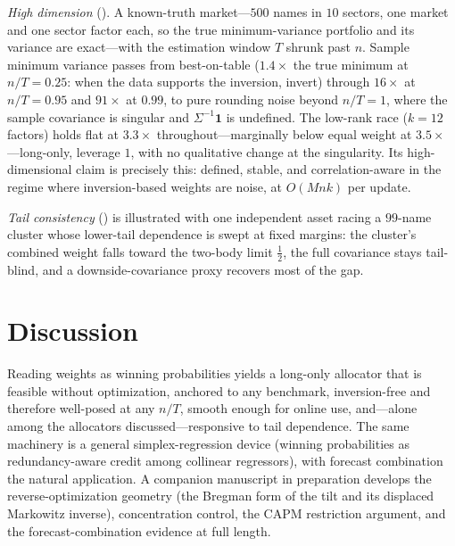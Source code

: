 \documentclass[11pt]{article}
\begin{document}
\emph{High dimension} (). A known-truth market---$500$ names
in $10$ sectors, one market and one sector factor each, so the true
minimum-variance portfolio and its variance are exact---with the estimation
window $T$ shrunk past $n$. Sample minimum variance passes from best-on-table
($1.4\times$ the true minimum at $n/T = 0.25$: when the data supports the
inversion, invert) through $16\times$ at $n/T = 0.95$ and $91\times$ at
$0.99$, to pure rounding noise beyond $n/T = 1$, where the sample covariance
is singular and $\Sigma^{-1}\mathbf 1$ is undefined. The low-rank race
($k = 12$ factors) holds flat at $3.3\times$ throughout---marginally below
equal weight at $3.5\times$---long-only, leverage $1$, with no qualitative
change at the singularity. Its high-dimensional claim is precisely this:
defined, stable, and correlation-aware in the regime where inversion-based
weights are noise, at $O(Mnk)$ per update.

\emph{Tail consistency} () is illustrated with one independent
asset racing a $99$-name cluster whose lower-tail dependence is swept at fixed
margins: the cluster's combined weight falls toward the two-body limit
$\tfrac12$, the full covariance stays tail-blind, and a downside-covariance
proxy recovers most of the gap.

\section{Discussion}
\label{sec:discussion}

Reading weights as winning probabilities yields a long-only allocator that is
feasible without optimization, anchored to any benchmark, inversion-free and
therefore well-posed at any $n/T$, smooth enough for online use, and---alone
among the allocators discussed---responsive to tail dependence. The same
machinery is a general simplex-regression device (winning probabilities as
redundancy-aware credit among collinear regressors), with forecast combination
the natural application. A companion manuscript in preparation develops the
reverse-optimization geometry (the Bregman form of the tilt and its displaced
Markowitz inverse), concentration control, the CAPM restriction argument, and
the forecast-combination evidence at full length.

\clearpage
\printbibliography

\clearpage
\end{document}
